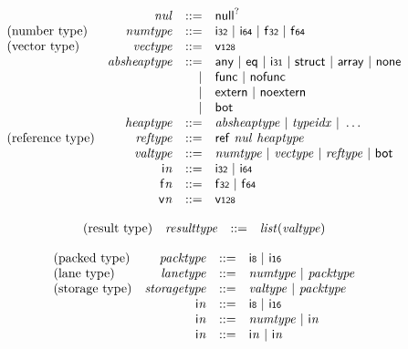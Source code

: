 $$
\begin{array}{@{}lrrl@{}l@{}}
& {\mathit{nul}} &::=& {\mathsf{null}^?} \\
\mbox{(number type)} & {\mathit{numtype}} &::=& \mathsf{i{\scriptstyle32}} ~|~ \mathsf{i{\scriptstyle64}} ~|~ \mathsf{f{\scriptstyle32}} ~|~ \mathsf{f{\scriptstyle64}} \\
\mbox{(vector type)} & {\mathit{vectype}} &::=& \mathsf{v{\scriptstyle128}} \\
& {\mathit{absheaptype}} &::=& \mathsf{any} ~|~ \mathsf{eq} ~|~ \mathsf{i{\scriptstyle31}} ~|~ \mathsf{struct} ~|~ \mathsf{array} ~|~ \mathsf{none} \\ &&|&
\mathsf{func} ~|~ \mathsf{nofunc} \\ &&|&
\mathsf{extern} ~|~ \mathsf{noextern} \\ &&|&
\mathsf{bot} \\
& {\mathit{heaptype}} &::=& {\mathit{absheaptype}} ~|~ {\mathit{typeidx}} ~|~ \dots \\
\mbox{(reference type)} & {\mathit{reftype}} &::=& \mathsf{ref}~{\mathit{nul}}~{\mathit{heaptype}} \\
& {\mathit{valtype}} &::=& {\mathit{numtype}} ~|~ {\mathit{vectype}} ~|~ {\mathit{reftype}} ~|~ \mathsf{bot} \\
& {\mathsf{i}}{{\mathit{n}}} &::=& \mathsf{i{\scriptstyle32}} ~|~ \mathsf{i{\scriptstyle64}} \\
& {\mathsf{f}}{{\mathit{n}}} &::=& \mathsf{f{\scriptstyle32}} ~|~ \mathsf{f{\scriptstyle64}} \\
& {\mathsf{v}}{{\mathit{n}}} &::=& \mathsf{v{\scriptstyle128}} \\
\end{array}
$$

\vspace{1ex}

$$
\begin{array}{@{}lrrl@{}l@{}}
\mbox{(result type)} & {\mathit{resulttype}} &::=& {\mathit{list}}({\mathit{valtype}}) \\
\end{array}
$$

\vspace{1ex}

$$
\begin{array}{@{}lrrl@{}l@{}}
\mbox{(packed type)} & {\mathit{packtype}} &::=& \mathsf{i{\scriptstyle8}} ~|~ \mathsf{i{\scriptstyle16}} \\
\mbox{(lane type)} & {\mathit{lanetype}} &::=& {\mathit{numtype}} ~|~ {\mathit{packtype}} \\
\mbox{(storage type)} & {\mathit{storagetype}} &::=& {\mathit{valtype}} ~|~ {\mathit{packtype}} \\
& {\mathsf{i}}{{\mathit{n}}} &::=& \mathsf{i{\scriptstyle8}} ~|~ \mathsf{i{\scriptstyle16}} \\
& {\mathsf{i}}{{\mathit{n}}} &::=& {\mathit{numtype}} ~|~ {\mathsf{i}}{{\mathit{n}}} \\
& {\mathsf{i}}{{\mathit{n}}} &::=& {\mathsf{i}}{{\mathit{n}}} ~|~ {\mathsf{i}}{{\mathit{n}}} \\
\end{array}
$$


